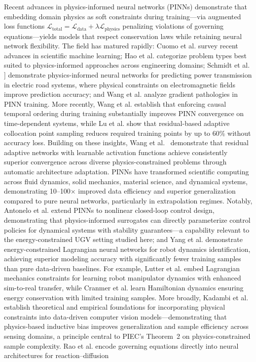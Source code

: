 \documentclass[pdflatex,sn-nature]{sn-jnl}%
\begin{document}
Recent advances in physics-informed neural networks (PINNs)\cite{Raissi2019,Karniadakis2021} demonstrate that embedding domain physics as soft constraints during training—via augmented loss functions $\mathcal{L}_{\text{total}} = \mathcal{L}_{\text{data}} + \lambda \mathcal{L}_{\text{physics}}$ penalizing violations of governing equations—yields models that respect conservation laws while retaining neural network flexibility. The field has matured rapidly: Cuomo et al.\cite{Cuomo2022} survey recent advances in scientific machine learning; Hao et al.\cite{Hao2023pinn} categorize problem types best suited to physics-informed approaches across engineering domains; Schmidt et al. \cite{Schmidt2024pinn}] demonstrate physics-informed neural networks for predicting power transmission in electric road systems, where physical constraints on electromagnetic fields improve prediction accuracy; and Wang et al.\cite{Wang2021grad} analyze gradient pathologies in PINN training. More recently, Wang et al.\cite{Wang2024causal} establish that enforcing causal temporal ordering during training substantially improves PINN convergence on time-dependent systems, while Lu et al.\cite{Wu2023adaptive} show that residual-based adaptive collocation point sampling reduces required training points by up to 60\% without accuracy loss. Building on these insights, Wang et al.~\cite{Wang2024piratenets} demonstrate that residual adaptive networks with learnable activation functions achieve consistently superior convergence across diverse physics-constrained problems through automatic architecture adaptation. PINNs have transformed scientific computing across fluid dynamics\cite{Wang2020pinn,Raissi2022hidden}, solid mechanics\cite{Haghighat2021}, material science\cite{Chen2021pinn_mat}, and dynamical systems\cite{Lutter2019,Cranmer2020}, demonstrating 10--100× improved data efficiency and superior generalization compared to pure neural networks, particularly in extrapolation regimes. Notably, Antonelo et al.\cite{Antonelo2024} extend PINNs to nonlinear closed-loop control design, demonstrating that physics-informed surrogates can directly parameterize control policies for dynamical systems with stability guarantees—a capability relevant to the energy-constrained UGV setting studied here; and Yang et al. \cite{Yang2025energy} demonstrate energy-constrained Lagrangian neural networks for robot dynamics identification, achieving superior modeling accuracy with significantly fewer training samples than pure data-driven baselines. For example, Lutter et al.\cite{Lutter2019} embed Lagrangian mechanics constraints for learning robot manipulator dynamics with enhanced sim-to-real transfer, while Cranmer et al.\cite{Cranmer2020} learn Hamiltonian dynamics ensuring energy conservation with limited training samples. More broadly, Kadambi et al.\cite{kadambi2023incorporating} establish theoretical and empirical foundations for incorporating physical constraints into data-driven computer vision models---demonstrating that physics-based inductive bias improves generalization and sample efficiency across sensing domains, a principle central to PIEC's Theorem~2 on physics-constrained sample complexity. Rao et al.\cite{rao2023encoding} encode governing equations directly into neural architectures for reaction--diffusion 
\end{document}
